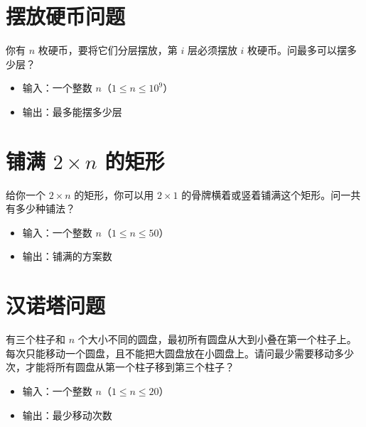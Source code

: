\documentclass[11pt]{exam-zh}
\begin{document}
\begin{center}
	
	
\end{center}


\section{摆放硬币问题}
你有 $n$ 枚硬币，要将它们分层摆放，第 $i$ 层必须摆放 $i$ 枚硬币。问最多可以摆多少层？

\begin{itemize}[leftmargin=2em]
	\item 输入：一个整数 $n$（$1 \leq n \leq 10^9$）
	\item 输出：最多能摆多少层
\end{itemize}

\begin{center}
\end{center}


\section{铺满 $2 \times n$ 的矩形}
给你一个 $2\times n$ 的矩形，你可以用 $2\times 1$ 的骨牌横着或竖着铺满这个矩形。问一共有多少种铺法？

\begin{itemize}[leftmargin=2em]
	\item 输入：一个整数 $n$（$1 \leq n \leq 50$）
	\item 输出：铺满的方案数
\end{itemize}

\begin{center}
	
	
\end{center}


\section{汉诺塔问题}
有三个柱子和 $n$ 个大小不同的圆盘，最初所有圆盘从大到小叠在第一个柱子上。每次只能移动一个圆盘，且不能把大圆盘放在小圆盘上。请问最少需要移动多少次，才能将所有圆盘从第一个柱子移到第三个柱子？

\begin{itemize}[leftmargin=2em]
	\item 输入：一个整数 $n$（$1 \leq n \leq 20$）
	\item 输出：最少移动次数
\end{itemize}
\end{document}
